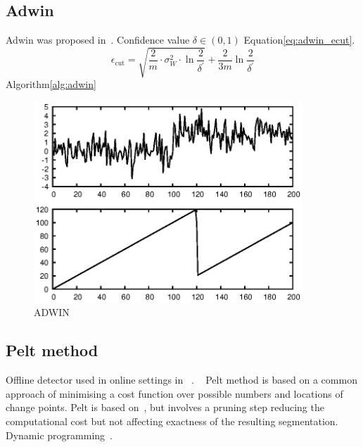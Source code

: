 \documentclass[doctoral,utf8,lot,loar,lof,shortloft,index]{jydiss}
\begin{document}
\subsection{Adwin}
Adwin was proposed in~\cite{bifet2007learning}.
Confidence value $\delta \in (0,1)$
Equation\ref{eq:adwin_ecut}.
\begin{equation}\label{eq:adwin_ecut}
	\epsilon_{\text{cut}} = \sqrt{\frac{2}{m} \cdot \sigma_W^2 \cdot \ln{\frac{2}{\delta^\prime}}} + \frac{2}{3m} \ln{\frac{2}{\delta^\prime}}
\end{equation}
Algorithm\ref{alg:adwin}

\begin{figure}[!htb]
	\centering
	\includegraphics[width=0.9\textwidth]{images/example_output_adwin.eps}
	\caption{ADWIN}\label{fig:adwin_output_example}
\end{figure}

\subsection{Pelt method}

Offline detector used in online settings in ~\cite{marrero2013aclac}.
~\cite{killick2012optimal}
Pelt method is based on a common approach of  minimising a cost function over possible numbers and locations of change points.
Pelt is based on~\cite{jackson2005algorithm}, but involves a pruning step reducing the computational cost but not affecting exactness of the resulting segmentation.
Dynamic programming~\cite{bellman1966dynamic}.
\end{document}
